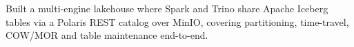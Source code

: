 
\vspace{3pt}
\begin{resume_list}
  \item Built a multi-engine lakehouse where Spark and Trino share Apache Iceberg tables via a Polaris REST catalog over MinIO, covering partitioning, time-travel, COW/MOR and table maintenance end-to-end.
\end{resume_list}

